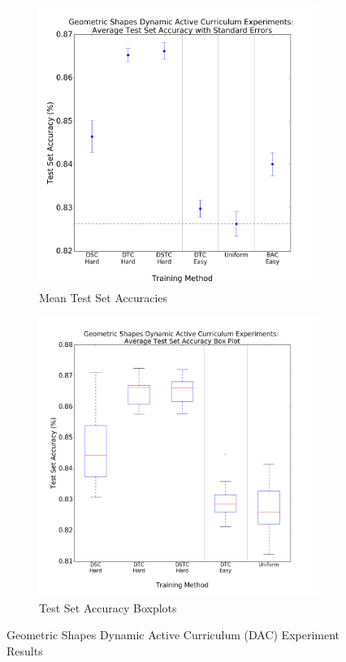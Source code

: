 \begin{figure}[h!]
\hspace*{-3cm}    
\centering
\begin{subfigure}{0.7\textwidth}
  \centering
  \includegraphics[width=1\linewidth]{GeoShapes_Dynamic_Results_STE.png}
  \caption{ Mean Test Set Accuracies}
  \label{fig:DAC_ste_Geo}
\end{subfigure}%
\begin{subfigure}{0.7\textwidth}
\hspace*{-1cm}   
  \centering
  \includegraphics[width=1\linewidth]{GeoShapes_Dynamic_Results_Boxplt.png}
  \caption{Test Set Accuracy Boxplots}
  \label{fig:DAC_BoxPlt_Geo}
\end{subfigure}
\caption{Geometric Shapes Dynamic Active Curriculum (DAC) Experiment Results}
\label{fig:GeoShapesDACResults}
\end{figure}

